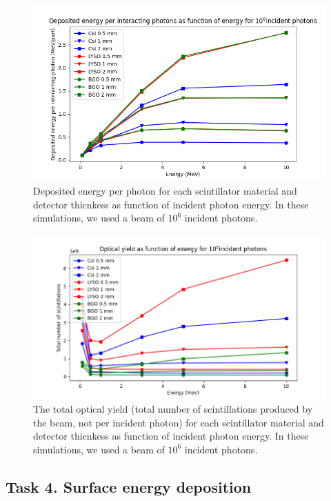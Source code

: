 \documentclass{article}
\begin{document}
\begin{figure}[H]
  \centering
  \includegraphics[width=\linewidth]{images/task3/deposited_energy_all.pdf}
  \caption{Deposited energy per photon for each scintillator material and detector thicnkess as function of incident photon energy. In these simulations,
  we used a beam of $10^6$ incident photons. }
\end{figure}

\begin{figure}[H]
  \centering
  \includegraphics[width=\linewidth]{images/task3/optical_yield_all.pdf}
  \caption{The total optical yield (total number of scintillations produced by the beam, not per incident photon) for each scintillator material and detector thicnkess as function of incident photon energy. In these simulations,
  we used a beam of $10^6$ incident photons. }
\end{figure}

\subsection{Task 4. Surface energy deposition}
\end{document}
